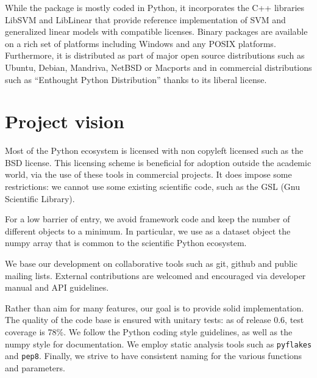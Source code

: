 \documentclass[twoside,11pt]{article}
\begin{document}
While the package is mostly coded in Python, it incorporates the C++
libraries LibSVM \citep{chang2001} and LibLinear \citep{fan2008} that
provide reference implementation of SVM and generalized linear models
with compatible licenses.
%
Binary packages are available on a rich set of platforms including
Windows and any POSIX platforms. Furthermore, it is distributed as part
of major open source distributions such as Ubuntu, Debian, Mandriva,
NetBSD or Macports and in commercial distributions such as ``Enthought
Python Distribution'' thanks to its liberal license.




\section {Project vision}

%
Most of the Python ecosystem is licensed with non copyleft licensed such
as the BSD license. This licensing scheme is beneficial for adoption
outside the academic world, via the use of these tools in commercial
projects. It does impose some restrictions: we cannot use some existing
scientific code, such as the GSL (Gnu Scientific Library).

\smallskip {}
%
For a low barrier of entry, we avoid framework code and keep the number
of different objects to a minimum. In particular, we use as a dataset
object the numpy array \citep{Vanderwalt2011} that is common to the
scientific Python ecosystem.

\smallskip
{}
%
We base our development on collaborative tools such as git, github and
public mailing lists. External contributions are welcomed and
encouraged via developer manual and API guidelines.

\smallskip {}
%
Rather than aim for many features, our goal is to provide solid
implementation. The quality of the code base is ensured with unitary
tests: as of release 0.6, test coverage is 78\%. We follow the Python
coding style guidelines, as well as the numpy style for documentation. We
employ static analysis tools such as {\tt pyflakes} and {\tt pep8}.
Finally, we strive to have consistent naming for the various functions
and parameters.
\end{document}
